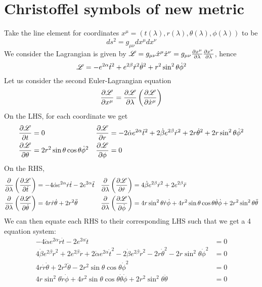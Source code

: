 \documentclass{article}
\begin{document}
	\section{Christoffel symbols of new metric}
		Take the line element for coordinates $x^\mu = (t(\lambda),r(\lambda), \theta (\lambda), \phi(\lambda))$ to be
		$$ ds^2 = g_{\mu\nu} dx^\mu dx^\nu$$
		We consider the Lagrangian is given by $\mathscr{L} = g_{\mu \nu} \dot{x}^\mu \dot{x}^\nu = g_{\mu\nu} \frac{\partial x^\mu}{\partial \lambda} \frac{\partial x^\nu}{\partial \lambda}$, hence
		$$ \mathscr{L} = -e^{2\alpha} \dot{t}^2 + e^{2\beta} \dot{r}^2 \dot{\theta}^2 + r^2 \sin^2 \theta \dot{\phi}^2$$
		Let us consider the second Euler-Lagrangian equation 
		$$  \frac{\partial \mathscr{L}}{\partial x^\mu} = \frac{\partial \mathscr{L}}{\partial \lambda} \left( \frac{\partial \mathscr{L}}{\partial \dot{x}^\mu}\right)$$
		On the LHS, for each coordinate we get
		\begin{align*}
			\frac{\partial \mathscr{L}}{\partial t} &= 0 & \frac{\partial \mathscr{L}}{\partial r} &= -2\dot{\alpha}e^{2\alpha} \dot{t}^2 + 2 \dot{\beta} e^{2\beta} \dot{r}^2 + 2r \dot{\theta}^2 + 2r \sin^2\theta \dot{\phi}^2 \\
			\frac{\partial \mathscr{L}}{\partial \theta} &= 2r^2 \sin\theta \cos \theta \dot{\phi}^2 & \frac{\partial \mathscr{L}}{\partial \phi} &= 0 
 		\end{align*}
		On the RHS, 
		\begin{align*}
			\frac{\partial}{\partial \lambda} \left( \frac{\partial \mathscr{L}}{\partial \dot{t}}  \right)  &= -4 \dot{\alpha} e^{2\alpha} \dot{r}\dot{t} - 2 e^{2\alpha} \ddot{t} &
			\frac{\partial}{\partial \lambda} \left( \frac{\partial \mathscr{L}}{\partial \dot{r}}  \right) &= 4\dot{\beta} e^{2\beta} \dot{r}^2+ 2e^{2\beta} \ddot{r}\\
			\frac{\partial}{\partial \lambda} \left( \frac{\partial \mathscr{L}}{\partial \dot{\theta}} \right) &=4r\dot{r}\dot{\theta} + 2 r^{2} \ddot{\theta} &
			\frac{\partial}{\partial \lambda} \left( \frac{\partial \mathscr{L}}{\partial \dot{\phi}}  \right) &= 4r\sin^2 \theta \dot{r} \dot{\phi} + 4r^2 \sin \theta \cos \theta \dot{\theta}\dot{\phi}  + 2r^2 \sin^2 \theta \ddot{\theta}  \\
		\end{align*}
			We can then equate each RHS to their corresponding LHS such that we get a 4 equation system:
			\begin{align*}
				-4 \dot{\alpha} e^{2\alpha} \dot{r}\dot{t} - 2 e^{2\alpha} \ddot{t} & = 0 \\
				4\dot{\beta} e^{2\beta} \dot{r}^2+ 2e^{2\beta} \ddot{r} +2\dot{\alpha}e^{2\alpha} \dot{t}^2 - 2 \dot{\beta} e^{2\beta} \dot{r}^2 - 2r \dot{\theta}^2 - 2r \sin^2\theta \dot{\phi}^2 &= 0 \\
				4r\dot{r}\dot{\theta} + 2 r^{2} \ddot{\theta} - 2r^2 \sin\theta \cos \theta \dot{\phi}^2 &= 0 \\
				 4r\sin^2 \theta \dot{r} \dot{\phi} + 4r^2 \sin \theta \cos \theta \dot{\theta}\dot{\phi}  + 2r^2 \sin^2 \theta \ddot{\theta} &= 0
			\end{align*}
\end{document}
